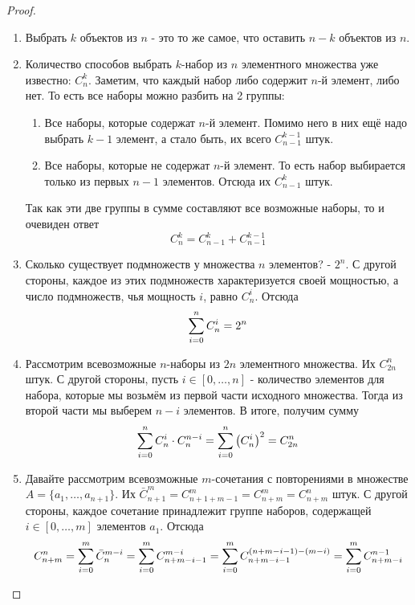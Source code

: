 \begin{proof}~
	\begin{enumerate}
		\item Выбрать $k$ объектов из $n$ - это то же самое, что оставить $n - k$ объектов из $n$.
		
		\item Количество способов выбрать $k$-набор из $n$ элементного множества уже известно: $C_n^k$. Заметим, что каждый набор либо содержит $n$-й элемент, либо нет. То есть все наборы можно разбить на 2 группы:
		\begin{enumerate}
			\item Все наборы, которые содержат $n$-й элемент. Помимо него в них ещё надо выбрать $k - 1$ элемент, а стало быть, их всего $C_{n - 1}^{k - 1}$ штук.
			
			\item Все наборы, которые не содержат $n$-й элемент. То есть набор выбирается только из первых $n - 1$ элементов. Отсюда их $C_{n - 1}^k$ штук.
		\end{enumerate}
		Так как эти две группы в сумме составляют все возможные наборы, то и очевиден ответ
		\[
			C_n^k = C_{n - 1}^k + C_{n - 1}^{k - 1}
		\]
		
		\item Сколько существует подмножеств у множества $n$ элементов? - $2^n$. С другой стороны, каждое из этих подмножеств характеризуется своей мощностью, а число подмножеств, чья мощность $i$, равно $C_n^i$. Отсюда
		\[
			\sum\limits_{i = 0}^n C_n^i = 2^n
		\]
		
		\item Рассмотрим всевозможные $n$-наборы из $2n$ элементного множества. Их $C_{2n}^n$ штук. С другой стороны, пусть $i \in [0, \ldots, n]$ - количество элементов для набора, которые мы возьмём из первой части исходного множества. Тогда из второй части мы выберем $n - i$ элементов. В итоге, получим сумму
		\[
			\sum\limits_{i = 0}^n C_n^i \cdot C_n^{n - i} = \sum\limits_{i = 0}^n \left(C_n^i\right)^2 = C_{2n}^n
		\]
		
		\item Давайте рассмотрим всевозможные $m$-сочетания с повторениями в множестве $A = \{a_1, \ldots, a_{n + 1}\}$. Их $\bar{C}_{n + 1}^m = C_{n + 1 + m - 1}^m = C_{n + m}^m = C_{n + m}^n$ штук. С другой стороны, каждое сочетание принадлежит группе наборов, содержащей $i \in [0, \ldots, m]$ элементов $a_1$. Отсюда
		\[
			C_{n + m}^n = \sum\limits_{i = 0}^m \bar{C}_n^{m - i} = \sum\limits_{i = 0}^m C_{n + m - i - 1}^{m - i} = \sum\limits_{i = 0}^m C_{n + m - i - 1}^{(n + m - i - 1) - (m - i)} = \sum\limits_{i = 0}^m C_{n + m - i}^{n - 1}
		\]
	\end{enumerate}
\end{proof}